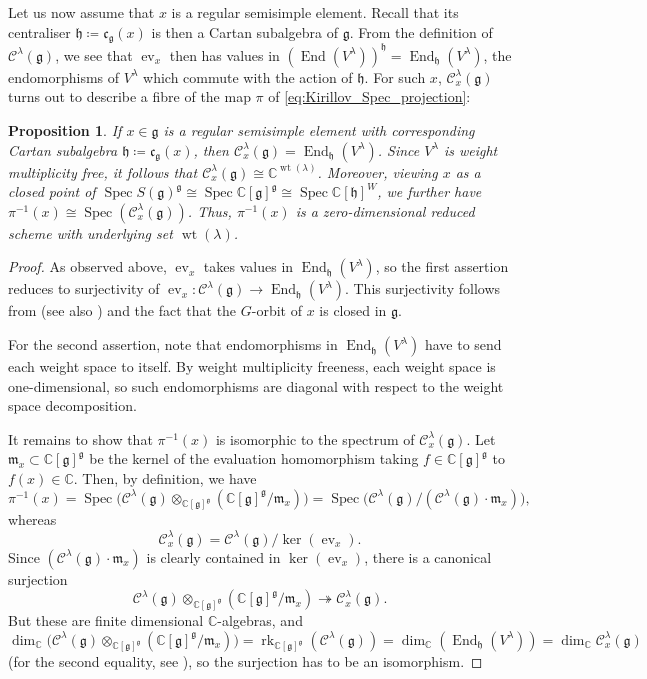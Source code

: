\documentclass{amsart}
\newcommand{\C}{\mathbb{C}}
\newcommand{\Kir}{\mathcal{C}}
\newcommand{\End}{\operatorname{End}}
\newcommand{\ev}{\operatorname{ev}}
\newcommand{\g}{\mathfrak{g}}
\newcommand{\h}{\mathfrak{h}}
\newcommand{\m}{\mathfrak{m}}
\newcommand{\Spec}{\operatorname{Spec}}
\newcommand{\wt}{\operatorname{wt}}
\newcommand{\inv}{^{-1}}
\theoremstyle{definition}
\theoremstyle{plain}
\newtheorem{prop}[defn]{Proposition}
\theoremstyle{remark}
\begin{document}
Let us now assume that $x$ is a regular semisimple element. Recall that its centraliser $\h\coloneqq \mathfrak{c}_\g(x)$ is then a Cartan subalgebra of $\g$. From the definition of $\Kir^\lambda(\g)$, we see that $\ev_x$ then has values in $(\End (V^\lambda))^\h = \End_\h (V^\lambda)$, the endomorphisms of $V^\lambda$ which commute with the action of $\h$. For such $x$, $\Kir^\lambda_x(\g)$ turns out to describe a fibre of the map $\pi$ of \eqref{eq:Kirillov_Spec_projection}:
\begin{prop}
\label{prop:evaluation_onto}
    If $x\in \g$ is a regular semisimple element with corresponding Cartan subalgebra $\h \coloneqq \mathfrak{c}_\g(x)$, then $\Kir^\lambda_x(\g) = \End_\h(V^\lambda)$. Since $V^\lambda$ is weight multiplicity free, it follows that $\Kir^\lambda_x(\g) \cong \C^{\wt(\lambda)}$. Moreover, viewing $x$ as a closed point of $\Spec S(\g)^\g \cong \Spec\C[\g]^\g \cong \Spec\C[\h]^W$, we further have $\pi\inv(x) \cong \Spec (\Kir^\lambda_x(\g))$. Thus, $\pi\inv(x)$ is a zero-dimensional reduced scheme with underlying set $\wt(\lambda)$. 
\end{prop}
\begin{proof}
    As observed above, $\ev_x$ takes values in $\End_\h(V^\lambda)$, so the first assertion reduces to surjectivity of $\ev_x\colon \Kir^\lambda(\g) \to \End_\h (V^\lambda)$. This surjectivity follows from \cite[Thm.\,1.4]{Panyushev2004_endoj} (see also \cite{Panyushev2002_covarj}) and the fact that the $G$-orbit of $x$ is closed in $\g$. 
    
    For the second assertion, note that endomorphisms in $\End_\h(V^\lambda)$ have to send each weight space to itself. By weight multiplicity freeness, each weight space is one-dimensional, so such endomorphisms are diagonal with respect to the weight space decomposition.

    It remains to show that $\pi\inv(x)$ is isomorphic to the spectrum of $\Kir^\lambda_x(\g)$. Let $\m_x \subset \C[\g]^\g$ be the kernel of the evaluation homomorphism taking $f\in \C[\g]^\g$ to $f(x)\in \C$. Then, by definition, we have
    $$
        \pi\inv(x)
        =
        \Spec \big(
            \Kir^\lambda(\g) \otimes_{\C[\g]^\g} (\C[\g]^\g/\m_x) 
        \big)
        =
        \Spec \big(
            \Kir^\lambda(\g)/(\Kir^\lambda(\g)\cdot \m_x)
        \big),
    $$
    whereas 
    $$
        \Kir^\lambda_x(\g) = \Kir^\lambda(\g)/\ker(\ev_x).
    $$
    Since $(\Kir^\lambda(\g)\cdot \m_x)$ is clearly contained in $\ker(\ev_x)$, there is a canonical surjection 
    $$
        \Kir^\lambda(\g) \otimes_{\C[\g]^\g} (\C[\g]^\g/\m_x)
        \twoheadrightarrow
        \Kir^\lambda_x(\g).
    $$
    But these are finite dimensional $\C$-algebras, and
    $$
        \dim_\C \big(\Kir^\lambda(\g) \otimes_{\C[\g]^\g} (\C[\g]^\g/\m_x))
        =
        \operatorname{rk}_{\C[\g]^\g}(\Kir^\lambda(\g))
        =
        \dim_\C (\End_\h(V^\lambda))
        =
        \dim_\C \Kir^\lambda_x(\g)
    $$
    (for the second equality, see \cite[p.\,4, above Cor.\,1]{Kirillov2001_introduction}), so the surjection has to be an isomorphism.
\end{proof}
\end{document}
